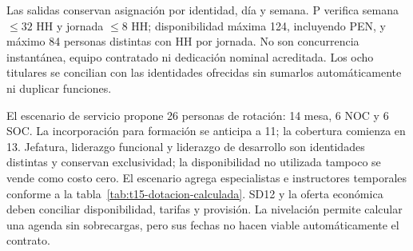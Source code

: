 Las salidas conservan asignación por identidad, día y semana. P verifica semana $\leq32$ HH y jornada $\leq8$ HH; disponibilidad máxima 124, incluyendo PEN, y máximo 84 personas distintas con HH por jornada. No son concurrencia instantánea, equipo contratado ni dedicación nominal acreditada. Los ocho titulares se concilian con las identidades ofrecidas sin sumarlos automáticamente ni duplicar funciones.

El escenario de servicio propone 26 personas de rotación: 14 mesa, 6 NOC y 6 SOC. La incorporación para formación se anticipa a 11; la cobertura comienza en 13. Jefatura, liderazgo funcional y liderazgo de desarrollo son identidades distintas y conservan exclusividad; la disponibilidad no utilizada tampoco se vende como costo cero. El escenario agrega especialistas e instructores temporales conforme a la tabla~\ref{tab:t15-dotacion-calculada}. SD12 y la oferta económica deben conciliar disponibilidad, tarifas y provisión. La nivelación permite calcular una agenda sin sobrecargas, pero sus fechas no hacen viable automáticamente el contrato.



